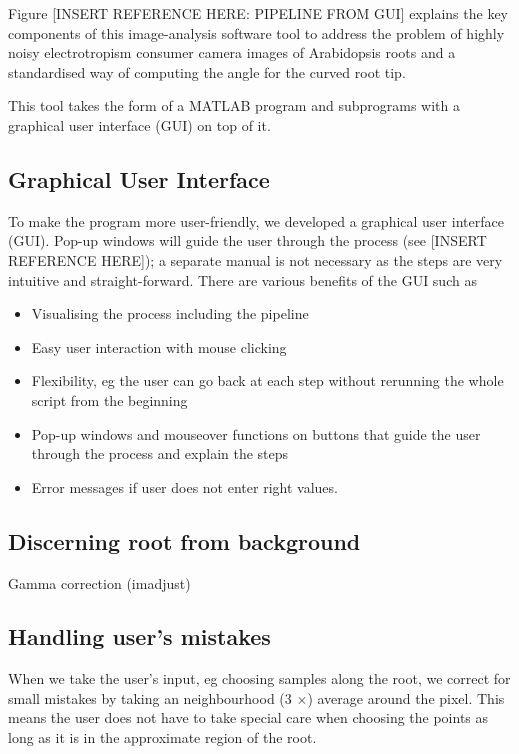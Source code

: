 Figure [INSERT REFERENCE HERE: PIPELINE FROM GUI] explains the key components of this image-analysis software tool to address the problem of highly noisy electrotropism consumer camera images of Arabidopsis roots and a standardised way of computing the angle for the curved root tip. 

This tool takes the form of a MATLAB program and subprograms with a graphical user interface (GUI) on top of it.

\subsection{Graphical User Interface}
To make the program more user-friendly, we developed a graphical user interface (GUI). Pop-up windows will guide the user through the process (see [INSERT REFERENCE HERE]); a separate manual is not necessary as the steps are very intuitive and straight-forward.
There are various benefits of the GUI such as
\begin{itemize}
	\item Visualising the process including the pipeline
	\item Easy user interaction with mouse clicking
	\item Flexibility, eg the user can go back at each step without rerunning the whole script from the beginning
	\item Pop-up windows and mouseover functions on buttons that guide the user through the process and explain the steps
	\item Error messages if user does not enter right values.
\end{itemize}


\subsection{Discerning root from background}

Gamma correction (imadjust)


\subsection{Handling user's mistakes}

When we take the user's input, eg choosing samples along the root, we correct for small mistakes by taking an neighbourhood (3 \( \times \)) average around the pixel. 
This means the user does not have to take special care when choosing the points as long as it is in the approximate region of the root.


